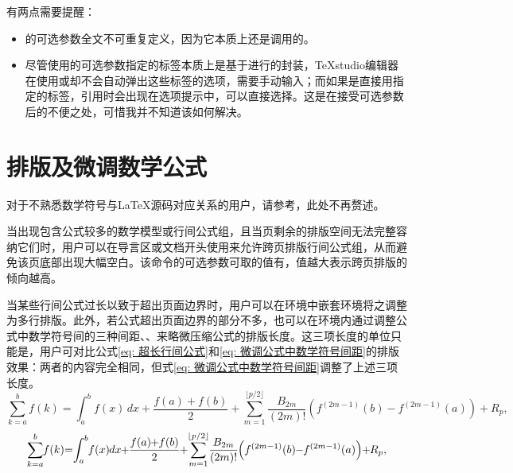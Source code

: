 有两点需要提醒：
\begin{itemize}
    \item {}的可选参数全文不可重复定义，因为它本质上还是调用的。
    \item 尽管使用的可选参数指定的标签本质上是基于进行的封装，TeXstudio编辑器在使用或却不会自动弹出这些标签的选项，需要手动输入；而如果是直接用指定的标签，引用时会出现在选项提示中，可以直接选择。这是在接受可选参数后的不便之处，可惜我并不知道该如何解决。
\end{itemize}

	
\section{排版及微调数学公式}

对于不熟悉数学符号与LaTeX源码对应关系的用户，请参考\href{https://www.cnblogs.com/1024th/p/11623258.html}{\color{DarkRed}}，此处不再赘述。

当出现包含公式较多的数学模型或行间公式组，且当页剩余的排版空间无法完整容纳它们时，用户可以在导言区或文档开头使用来允许跨页排版行间公式组，从而避免该页底部出现大幅空白。该命令的可选参数可取的值有，值越大表示跨页排版的倾向越高。

当某些行间公式过长以致于超出页面边界时，用户可以在环境中嵌套环境将之调整为多行排版。此外，若公式超出页面边界的部分不多，也可以在环境内通过调整公式中数学符号间的三种间距、、来略微压缩公式的排版长度。这三项长度的单位只能是，用户可对比公式\eqref{eq: 超长行间公式}和\eqref{eq: 微调公式中数学符号间距}的排版效果：两者的内容完全相同，但式\eqref{eq: 微调公式中数学符号间距}调整了上述三项长度。
\begin{equation} \label{eq: 超长行间公式}
    \sum_{k=a}^{b} f(k) = \int_{a}^{b} f(x) \, dx + \frac{f(a) + f(b)}{2} + \sum_{m=1}^{\lfloor p/2 \rfloor} \frac{B_{2m}}{(2m)!} \left( f^{(2m-1)}(b) - f^{(2m-1)}(a) \right) + R_p,
\end{equation}
\begin{equation} \label{eq: 微调公式中数学符号间距}
    \thinmuskip=-1mu \medmuskip=-1mu \thickmuskip=0mu
    \sum_{k=a}^{b} f(k) = \int_{a}^{b} f(x) \, dx + \frac{f(a) + f(b)}{2} + \sum_{m=1}^{\lfloor p/2 \rfloor} \frac{B_{2m}}{(2m)!} \left( f^{(2m-1)}(b) - f^{(2m-1)}(a) \right) + R_p,
\end{equation}



